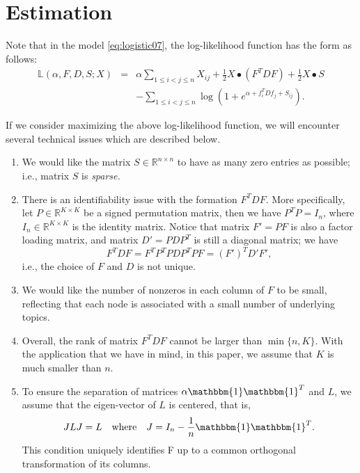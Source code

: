 \documentclass[AMS,STIX1COL]{WileyNJD-v2}
\begin{document}
\section{Estimation}
\label{sec:estimate}


Note that in the model \eqref{eq:logistic07}, the log-likelihood function has the form as follows:
\begin{eqnarray}
\label{eq:logistic08}
\mathbb{L}(\alpha,  F, D, S; X)
&=& \alpha \sum_{1\le i< j\le n}X_{ij} +\frac{1}{2} X \bullet (F^T D F) +\frac{1}{2} X \bullet S \\
&& -\sum_{1\le i<j\le n} \log \left(1 + e^{\alpha + f_i^T D f_j +S_{ij} }\right). \nonumber
\end{eqnarray}

If we consider maximizing the above log-likelihood function,
we will encounter several technical issues which are described below.
\begin{enumerate}
\item We would like the matrix $S \in \mathbb{R}^{n \times n}$ to have as many zero entries as possible; i.e., matrix $S$ is {\it sparse.}

\item There is an identifiability issue with the formation $F^T D F$.
More specifically, let $P \in \mathbb{R}^{K \times K}$ be a signed permutation matrix, then we have $P^T P = I_n$, where $I_n \in \mathbb{R}^{K \times K}$ is the identity matrix.
Notice that matrix $F' = PF$ is also a factor loading matrix, and
matrix $D' = P D P^T$ is still a diagonal matrix;
we have
$$
F^T D F = F^T P^T P D P^T P F = (F')^T D' F',
$$
i.e., the choice of $F$ and $D$ is not unique.

\item We would like the number of nonzeros in each column of $F$ to be small, reflecting that each node is associated with a small number of underlying topics.

\item Overall, the rank of matrix $F^T D F$ cannot be larger than $\min\{n,K\}$.
With the application that we have in mind, in this paper, we assume that $K$ is much smaller than $n$.

\item To ensure the separation of matrices $\alpha\mathbbm{1}\mathbbm{1}^T$ and $L$, we assume that the eigen-vector of $L$ is centered, that is,
\[
    JLJ = L \quad \mbox{where} \quad
    J=I_{n}-\frac{1}{n}\mathbbm{1}\mathbbm{1}^T. 
\]
This condition uniquely identifies F up to a common orthogonal transformation of its columns.

\end{enumerate}
\end{document}
